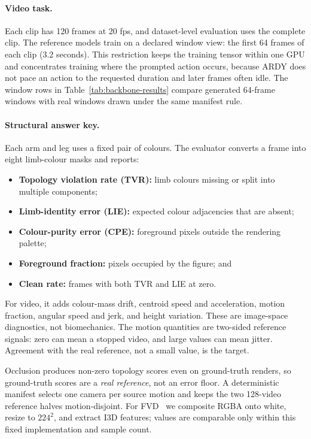 \documentclass[11pt]{article}
\begin{document}
\paragraph{Video task.} Each clip has 120 frames at 20 fps, and dataset-level evaluation uses the complete
clip. The reference models train on a declared window view: the first 64 frames of each clip (3.2 seconds).
This restriction keeps the training tensor within one GPU and concentrates training where the prompted action
occurs, because ARDY does not pace an action to the requested duration and later frames often idle. The window
rows in Table~\ref{tab:backbone-results} compare generated 64-frame windows with real windows drawn under the
same manifest rule.

\paragraph{Structural answer key.} Each arm and leg uses a fixed pair of colours. The evaluator converts a
frame into eight limb-colour masks and reports:
\begin{itemize}\setlength\itemsep{0pt}
    \item \textbf{Topology violation rate (TVR):} limb colours missing or split into multiple components;
    \item \textbf{Limb-identity error (LIE):} expected colour adjacencies that are absent;
    \item \textbf{Colour-purity error (CPE):} foreground pixels outside the rendering palette;
    \item \textbf{Foreground fraction:} pixels occupied by the figure; and
    \item \textbf{Clean rate:} frames with both TVR and LIE at zero.
\end{itemize}
For video, it adds colour-mass drift, centroid speed and acceleration, motion fraction, angular speed and
jerk, and height variation. These are image-space diagnostics, not biomechanics. The motion quantities are
two-sided reference signals: zero can mean a stopped video, and large values can mean jitter. Agreement with
the real reference, not a small value, is the target.

Occlusion produces non-zero topology scores even on ground-truth renders, so ground-truth scores are a
\emph{real reference}, not an error floor. A deterministic manifest selects one camera per source motion and
keeps the two 128-video reference halves motion-disjoint. For FVD~\cite{unterthiner2018fvd} we composite RGBA
onto white, resize to $224^2$, and extract I3D features; values are comparable only within this fixed
implementation and sample count.
\end{document}
